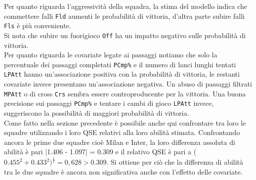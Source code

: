 Per quanto riguarda l'aggressività della squadra, la stima del modello indica che commettere falli \texttt{Fld} aumenti le probabilità di vittoria, d'altra parte subire falli \texttt{Fls} è più conveniente.\\ 
Si nota che subire un fuorigioco \texttt{Off} ha un impatto negativo sulle probabilità di vittoria.\\
Per quanto riguarda le covariate legate ai passaggi notiamo che solo la percentuale dei passaggi completati \texttt{PCmp\%} e il numero di lanci lunghi tentati \texttt{LPAtt} hanno un’associazione positiva con la probabilità di vittoria, le restanti covariate invece presentano un'associazione negativa. Un abuso di passaggi filtrati \texttt{MPAtt} o di cross \texttt{Crs} sembra essere controproducente per la vittoria. Una buona precisione sui passaggi \texttt{PCmp\%} e tentare i cambi di gioco \texttt{LPAtt} invece, suggeriscono la possibilità di maggiori probabilità di vittoria. \\
Come fatto nella sezione precedente è possibile anche qui confrontare tra loro le squadre utilizzando i loro QSE relativi alla loro abilità stimata.
Confrontando ancora le prime due squadre cioè Milan e Inter, la loro differenza assoluta di abilità è pari |1.406 - 1.097| = 0.309 e il relativo QSE è pari a ($0.455^2 + 0.433^2)^\frac{1}{2}=0,628 > 0.309$. Si ottiene per ciò che la differenza di abilità tra le due squadre è ancora non significativa anche con l’effetto delle covariate.
